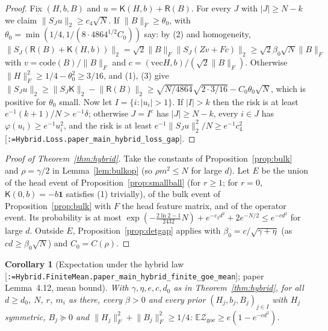\documentclass[11pt]{article}
\makeatletter
\newcommand{\formal@break}[1]{\@tfor\formal@tok:=#1\do{%
  \formal@tok
  \expandafter\ifx\formal@tok.\allowbreak\else
  \expandafter\ifx\formal@tok\_\allowbreak\fi\fi}}
\DeclareRobustCommand{\formal}[1]{\textnormal{[\texttt{\small\formal@break{#1}}]}}
\newcommand{\E}{\mathbb{E}}
\newcommand{\norm}[1]{\lVert #1\rVert}
\newcommand{\abs}[1]{\lvert #1\rvert}
\newcommand{\Fro}{F}
\newcommand{\one}{\mathbf{1}}
\theoremstyle{plain}
\newtheorem{corollary}[theorem]{Corollary}
\theoremstyle{definition}
\makeatother
\begin{document}
\begin{proof}
Fix $(H, b, B)$ and $u = \mathsf{K}(H,b) + \mathsf{R}(B)$. For every $J$ with
$\abs{J} \ge N - k$ we claim $\norm{S_Ju}_2 \ge c_4\sqrt N$. If $\norm{B}_\Fro \ge \theta_0$,
with $\theta_0 = \min(1/4, 1/(8\cdot4864^{1/2}C_0))$ say: by (2) and
homogeneity, $\norm{S_J(\mathsf{R}(B) + \mathsf{K}(H,b))}_2 = \sqrt2\norm{B}_\Fro\norm{S_J(Zv + Fc)}_2 \ge \sqrt2\beta_0\sqrt N\norm{B}_\Fro$
with $v = \mathrm{code}(B)/\norm{B}_\Fro$ and $c = (\mathrm{vec}H, b)/(\sqrt2\norm{B}_\Fro)$.
Otherwise $\norm{H}_\Fro^2 \ge 1/4 - \theta_0^2 \ge 3/16$, and (1), (3) give
$\norm{S_Ju}_2 \ge \norm{S_J\mathsf{K}}_2 - \norm{\mathsf{R}(B)}_2 \ge \sqrt{N/4864}\sqrt{2\cdot3/16} - C_0\theta_0\sqrt N$,
which is positive for $\theta_0$ small. Now let $I = \{i : \abs{u_i} > 1\}$. If
$\abs{I} > k$ then the risk is at least $e^{-1}(k+1)/N > e^{-1}\delta$; otherwise
$J = I^c$ has $\abs{J} \ge N - k$, every $i \in J$ has $\varphi(u_i) \ge e^{-1}u_i^2$,
and the risk is at least $e^{-1}\norm{S_Ju}_2^2/N \ge e^{-1}c_4^2$
\formal{Hybrid.Loss.paper\_main\_hybrid\_loss\_gap}.
\end{proof}

\begin{proof}[Proof of Theorem~\ref{thm:hybrid}]
Take the constants of Proposition~\ref{prop:bulk} and $\rho = \gamma/2$ in
Lemma~\ref{lem:bulkop} (so $\rho m^2 \le N$ for large $d$). Let $E$ be the
union of the head event of Proposition~\ref{prop:smallball} (for $r \ge 1$;
for $r = 0$, $\mathsf{K}(0, b) = -b\one$ satisfies (1) trivially), of the bulk
event of Proposition~\ref{prop:bulk} with $F$ the head feature matrix, and of
the operator event. Its probability is at most
$\exp(-\frac{2\ln2-1}{2432}N) + e^{-c_2d^2} + 2e^{-N/2} \le e^{-cd^2}$ for large
$d$. Outside $E$, Proposition~\ref{prop:detgap} applies with
$\beta_0 = c/\sqrt{\gamma + \eta}$ (as $cd \ge \beta_0\sqrt N$) and
$C_0 = C(\rho)$.
\end{proof}

\begin{corollary}[Expectation under the hybrid law \formal{Hybrid.FiniteMean.paper\_main\_hybrid\_finite\_goe\_mean}; paper Lemma~4.12, mean bound]\label{cor:goe_mean}
With $\gamma, \eta, e, c, d_0$ as in Theorem~\ref{thm:hybrid}, for all
$d \ge d_0$, $N$, $r$, $m_i$ as there, every $\beta > 0$ and every prior
$(H_j, b_j, B_j)_{j\in I}$ with $H_j$ symmetric, $B_j \succeq 0$ and
$\norm{H_j}_\Fro^2 + \norm{B_j}_\Fro^2 \ge 1/4$:
$\E\mathcal{Z}_{\mathrm{goe}} \ge e(1 - e^{-cd^2})$.
\end{corollary}
\end{document}
